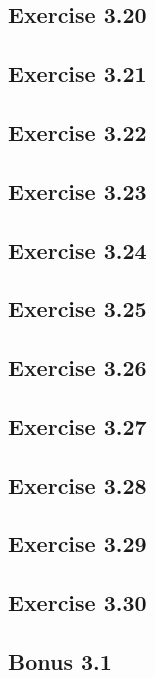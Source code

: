 \documentclass[../A&M.tex]{subfiles}
\begin{document}
\subsection*{Exercise 3.20}

\subsection*{Exercise 3.21}

\subsection*{Exercise 3.22}

\subsection*{Exercise 3.23}

\subsection*{Exercise 3.24}

\subsection*{Exercise 3.25}

\subsection*{Exercise 3.26}

\subsection*{Exercise 3.27}

\subsection*{Exercise 3.28}

\subsection*{Exercise 3.29}

\subsection*{Exercise 3.30}

\subsection*{Bonus 3.1} \label{Bonus 3.1}
\end{document}
